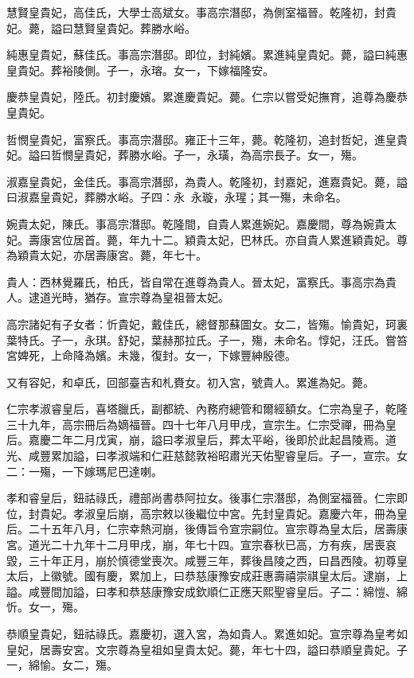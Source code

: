 \begin{pinyinscope}
慧賢皇貴妃，高佳氏，大學士高斌女。事高宗潛邸，為側室福晉。乾隆初，封貴妃。薨，謚曰慧賢皇貴妃。葬勝水峪。

純惠皇貴妃，蘇佳氏。事高宗潛邸。即位，封純嬪。累進純皇貴妃。薨，謚曰純惠皇貴妃。葬裕陵側。子一，永瑢。女一，下嫁福隆安。

慶恭皇貴妃，陸氏。初封慶嬪。累進慶貴妃。薨。仁宗以嘗受妃撫育，追尊為慶恭皇貴妃。

哲憫皇貴妃，富察氏。事高宗潛邸。雍正十三年，薨。乾隆初，追封哲妃，進皇貴妃。謚曰哲憫皇貴妃，葬勝水峪。子一，永璜，為高宗長子。女一，殤。

淑嘉皇貴妃，金佳氏。事高宗潛邸，為貴人。乾隆初，封嘉妃，進嘉貴妃。薨，謚曰淑嘉皇貴妃，葬勝水峪。子四：永，永璇，永瑆；其一殤，未命名。

婉貴太妃，陳氏。事高宗潛邸。乾隆間，自貴人累進婉妃。嘉慶間，尊為婉貴太妃。壽康宮位居首。薨，年九十二。穎貴太妃，巴林氏。亦自貴人累進穎貴妃。尊為穎貴太妃，亦居壽康宮。薨，年七十。

貴人：西林覺羅氏，柏氏，皆自常在進尊為貴人。晉太妃，富察氏。事高宗為貴人。逮道光時，猶存。宣宗尊為皇祖晉太妃。

高宗諸妃有子女者：忻貴妃，戴佳氏，總督那蘇圖女。女二，皆殤。愉貴妃，珂裏葉特氏。子一，永琪。舒妃，葉赫那拉氏。子一，殤，未命名。惇妃，汪氏。嘗笞宮婢死，上命降為嬪。未幾，復封。女一，下嫁豐紳殷德。

又有容妃，和卓氏，回部臺吉和札賚女。初入宮，號貴人。累進為妃。薨。

仁宗孝淑睿皇后，喜塔臘氏，副都統、內務府總管和爾經額女。仁宗為皇子，乾隆三十九年，高宗冊后為嫡福晉。四十七年八月甲戌，宣宗生。仁宗受禪，冊為皇后。嘉慶二年二月戊寅，崩，謚曰孝淑皇后，葬太平峪，後即於此起昌陵焉。道光、咸豐累加謚，曰孝淑端和仁莊慈懿敦裕昭肅光天佑聖睿皇后。子一，宣宗。女二：一殤，一下嫁瑪尼巴達喇。

孝和睿皇后，鈕祜祿氏，禮部尚書恭阿拉女。後事仁宗潛邸，為側室福晉。仁宗即位，封貴妃。孝淑皇后崩，高宗敕以後繼位中宮。先封皇貴妃。嘉慶六年，冊為皇后。二十五年八月，仁宗幸熱河崩，後傳旨令宣宗嗣位。宣宗尊為皇太后，居壽康宮。道光二十九年十二月甲戌，崩，年七十四。宣宗春秋已高，方有疾，居喪哀毀，三十年正月，崩於慎德堂喪次。咸豐三年，葬後昌陵之西，曰昌西陵。初尊皇太后，上徽號。國有慶，累加上，曰恭慈康豫安成莊惠壽禧崇祺皇太后。逮崩，上謚。咸豐間加謚，曰孝和恭慈康豫安成欽順仁正應天熙聖睿皇后。子二：綿愷、綿忻。女一，殤。

恭順皇貴妃，鈕祜祿氏。嘉慶初，選入宮，為如貴人。累進如妃。宣宗尊為皇考如皇妃，居壽安宮。文宗尊為皇祖如皇貴太妃。薨，年七十四，謚曰恭順皇貴妃。子一，綿愉。女二，殤。


\end{pinyinscope}
